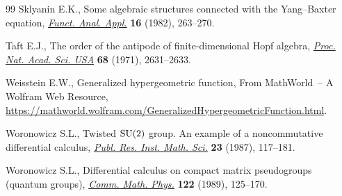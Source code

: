 \begin{thebibliography}{99}
Sklyanin E.K., Some algebraic structures connected with the {Y}ang--{B}axter
 equation, \href{https://doi.org/10.1007/BF01077848}{\textit{Funct. Anal. Appl.}} \textbf{16} (1982), 263--270.

Taft E.J., The order of the antipode of finite-dimensional {H}opf algebra,
 \href{https://doi.org/10.1073/pnas.68.11.2631}{\textit{Proc. Nat. Acad. Sci. USA}} \textbf{68} (1971), 2631--2633.

Weisstein E.W., Generalized hypergeometric function, {F}rom MathWorld~-- A
 Wolfram Web Resource,
 \url{https://mathworld.wolfram.com/GeneralizedHypergeometricFunction.html}.

Woronowicz S.L., Twisted {${\rm SU}(2)$} group. {A}n example of a
 noncommutative differential calculus, \href{https://doi.org/10.2977/prims/1195176848}{\textit{Publ. Res. Inst. Math. Sci.}}
 \textbf{23} (1987), 117--181.

Woronowicz S.L., Differential calculus on compact matrix pseudogroups (quantum
 groups), \href{https://doi.org/10.1007/BF01221411}{\textit{Comm. Math. Phys.}} \textbf{122} (1989), 125--170.

\end{thebibliography}
